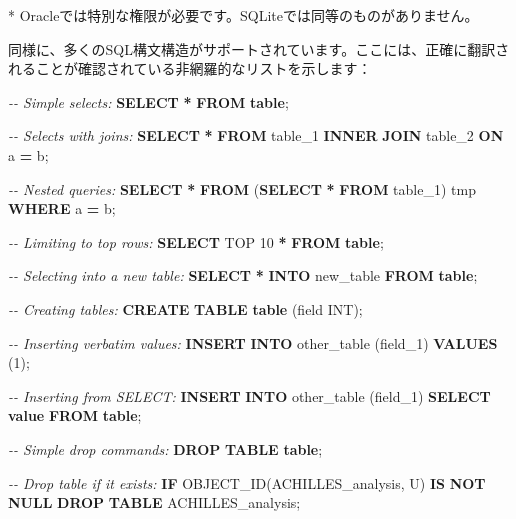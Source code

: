 \documentclass[
  11pt]{book}
\newenvironment{Shaded}{\begin{snugshade}}{\end{snugshade}}
\newcommand{\CommentTok}[1]{\textcolor[rgb]{0.56,0.35,0.01}{\textit{#1}}}
\newcommand{\ControlFlowTok}[1]{\textcolor[rgb]{0.13,0.29,0.53}{\textbf{#1}}}
\newcommand{\DataTypeTok}[1]{\textcolor[rgb]{0.13,0.29,0.53}{#1}}
\newcommand{\DecValTok}[1]{\textcolor[rgb]{0.00,0.00,0.81}{#1}}
\newcommand{\FunctionTok}[1]{\textcolor[rgb]{0.13,0.29,0.53}{\textbf{#1}}}
\newcommand{\KeywordTok}[1]{\textcolor[rgb]{0.13,0.29,0.53}{\textbf{#1}}}
\newcommand{\NormalTok}[1]{#1}
\newcommand{\OperatorTok}[1]{\textcolor[rgb]{0.81,0.36,0.00}{\textbf{#1}}}
\newcommand{\StringTok}[1]{\textcolor[rgb]{0.31,0.60,0.02}{#1}}
\theoremstyle{definition}
\theoremstyle{definition}
\theoremstyle{definition}
\theoremstyle{definition}
\theoremstyle{remark}
\begin{document}
* Oracleでは特別な権限が必要です。SQLiteでは同等のものがありません。

同様に、多くのSQL構文構造がサポートされています。ここには、正確に翻訳されることが確認されている非網羅的なリストを示します：

\begin{Shaded}
\begin{Highlighting}[]
\CommentTok{{-}{-} Simple selects:}
\KeywordTok{SELECT} \OperatorTok{*} \KeywordTok{FROM} \KeywordTok{table}\NormalTok{;}

\CommentTok{{-}{-} Selects with joins:}
\KeywordTok{SELECT} \OperatorTok{*} \KeywordTok{FROM}\NormalTok{ table\_1 }\KeywordTok{INNER} \KeywordTok{JOIN}\NormalTok{ table\_2 }\KeywordTok{ON}\NormalTok{ a }\OperatorTok{=}\NormalTok{ b;}

\CommentTok{{-}{-} Nested queries:}
\KeywordTok{SELECT} \OperatorTok{*} \KeywordTok{FROM}\NormalTok{ (}\KeywordTok{SELECT} \OperatorTok{*} \KeywordTok{FROM}\NormalTok{ table\_1) tmp }\KeywordTok{WHERE}\NormalTok{ a }\OperatorTok{=}\NormalTok{ b;}

\CommentTok{{-}{-} Limiting to top rows:}
\KeywordTok{SELECT}\NormalTok{ TOP }\DecValTok{10} \OperatorTok{*} \KeywordTok{FROM} \KeywordTok{table}\NormalTok{;}

\CommentTok{{-}{-} Selecting into a new table:}
\KeywordTok{SELECT} \OperatorTok{*} \KeywordTok{INTO}\NormalTok{ new\_table }\KeywordTok{FROM} \KeywordTok{table}\NormalTok{;}

\CommentTok{{-}{-} Creating tables:}
\KeywordTok{CREATE} \KeywordTok{TABLE} \KeywordTok{table}\NormalTok{ (field }\DataTypeTok{INT}\NormalTok{);}

\CommentTok{{-}{-} Inserting verbatim values:}
\KeywordTok{INSERT} \KeywordTok{INTO}\NormalTok{ other\_table (field\_1) }\KeywordTok{VALUES}\NormalTok{ (}\DecValTok{1}\NormalTok{);}

\CommentTok{{-}{-} Inserting from SELECT:}
\KeywordTok{INSERT} \KeywordTok{INTO}\NormalTok{ other\_table (field\_1) }\KeywordTok{SELECT} \FunctionTok{value} \KeywordTok{FROM} \KeywordTok{table}\NormalTok{;}

\CommentTok{{-}{-} Simple drop commands:}
\KeywordTok{DROP} \KeywordTok{TABLE} \KeywordTok{table}\NormalTok{;}

\CommentTok{{-}{-} Drop table if it exists:}
\ControlFlowTok{IF}\NormalTok{ OBJECT\_ID(}\StringTok{\textquotesingle{}ACHILLES\_analysis\textquotesingle{}}\NormalTok{, }\StringTok{\textquotesingle{}U\textquotesingle{}}\NormalTok{) }\KeywordTok{IS} \KeywordTok{NOT} \KeywordTok{NULL}
  \KeywordTok{DROP} \KeywordTok{TABLE}\NormalTok{ ACHILLES\_analysis;}


\end{Highlighting}
\end{Shaded}
\end{document}
